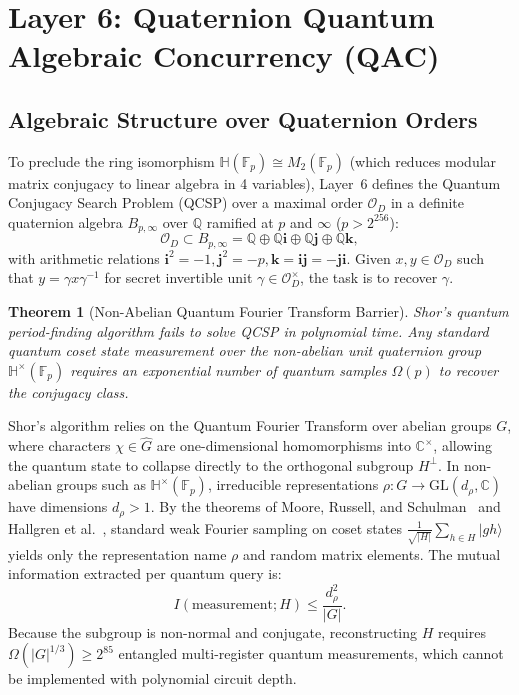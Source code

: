 \documentclass{ieeeaccess}
\newcommand{\F}{\mathbb{F}}
\newcommand{\calO}{\mathcal{O}}
\newtheorem{theorem}{Theorem}
\newenvironment{proof}{\begin{IEEEproof}\IEEEQEDoff}{\end{IEEEproof}}
\begin{document}
\section{Layer 6: Quaternion Quantum Algebraic Concurrency (QAC)}
\label{sec:L6}

\subsection{Algebraic Structure over Quaternion Orders}
To preclude the ring isomorphism $\mathbb{H}(\F_p) \cong M_2(\F_p)$ (which reduces modular matrix conjugacy to linear algebra in 4 variables), Layer~6 defines the Quantum Conjugacy Search Problem (QCSP) over a maximal order $\calO_D$ in a definite quaternion algebra $B_{p,\infty}$ over $\mathbb{Q}$ ramified at $p$ and $\infty$ ($p > 2^{256}$):
\begin{equation}
  \calO_D \subset B_{p,\infty} = \mathbb{Q} \oplus \mathbb{Q}\mathbf{i} \oplus \mathbb{Q}\mathbf{j} \oplus \mathbb{Q}\mathbf{k},
\end{equation}
with arithmetic relations $\mathbf{i}^2 = -1, \mathbf{j}^2 = -p, \mathbf{k} = \mathbf{i}\mathbf{j} = -\mathbf{j}\mathbf{i}$.
Given $x, y \in \calO_D$ such that $y = \gamma x \gamma^{-1}$ for secret invertible unit $\gamma \in \calO_D^\times$, the task is to recover $\gamma$.

\begin{theorem}[Non-Abelian Quantum Fourier Transform Barrier]
\label{thm:L6-qft}
Shor's quantum period-finding algorithm fails to solve QCSP in polynomial time. Any standard quantum coset state measurement over the non-abelian unit quaternion group $\mathbb{H}^\times(\F_p)$ requires an exponential number of quantum samples $\Omega(p)$ to recover the conjugacy class.
\end{theorem}
\begin{proof}
Shor's algorithm relies on the Quantum Fourier Transform over abelian groups $G$, where characters $\chi \in \widehat{G}$ are one-dimensional homomorphisms into $\mathbb{C}^\times$, allowing the quantum state to collapse directly to the orthogonal subgroup $H^\perp$.
In non-abelian groups such as $\mathbb{H}^\times(\F_p)$, irreducible representations $\rho : G \to \mathrm{GL}(d_\rho, \mathbb{C})$ have dimensions $d_\rho > 1$.
By the theorems of Moore, Russell, and Schulman~\cite{MooreRussell2007} and Hallgren et al.~\cite{Hallgren2003}, standard weak Fourier sampling on coset states $\frac{1}{\sqrt{|H|}} \sum_{h \in H} |g h\rangle$ yields only the representation name $\rho$ and random matrix elements.
The mutual information extracted per quantum query is:
\begin{equation}
  I(\text{measurement}; H) \leq \frac{d_\rho^2}{|G|}.
\end{equation}
Because the subgroup is non-normal and conjugate, reconstructing $H$ requires $\Omega(|G|^{1/3}) \geq 2^{85}$ entangled multi-register quantum measurements, which cannot be implemented with polynomial circuit depth.
\end{proof}
\end{document}

